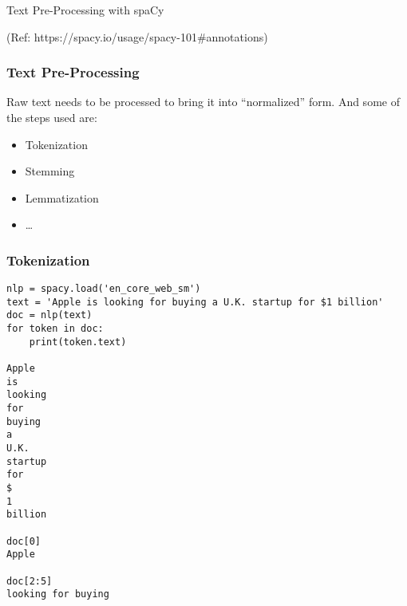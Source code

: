 
\begin{frame}[fragile]\frametitle{}

\begin{center}
{\Large Text Pre-Processing with spaCy}

{\tiny (Ref: https://spacy.io/usage/spacy-101\#annotations)}

\end{center}


\end{frame}

\begin{frame}[fragile]\frametitle{Text Pre-Processing}
Raw  text needs to be processed to bring it into ``normalized'' form. And some of the steps used are:

\begin{itemize}
\item Tokenization
\item Stemming
\item Lemmatization
\item \ldots
\end{itemize}
\end{frame}


\begin{frame}[fragile]\frametitle{Tokenization}

\begin{lstlisting}
nlp = spacy.load('en_core_web_sm')
text = 'Apple is looking for buying a U.K. startup for $1 billion'
doc = nlp(text)
for token in doc:
    print(token.text)
		
Apple
is
looking
for
buying
a
U.K.
startup
for
$
1
billion

doc[0]
Apple

doc[2:5]
looking for buying
\end{lstlisting}
\end{frame}


